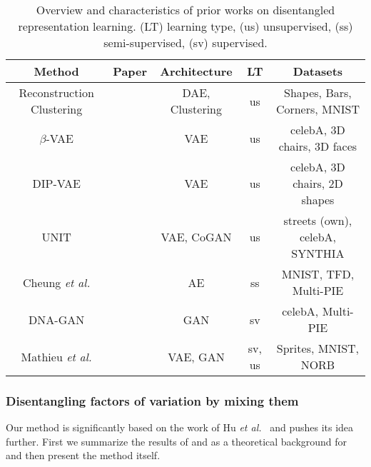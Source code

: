 \documentclass[12pt,a4paper]{article}
\begin{document}
\begin{table} [H]
\centering
\begin{tabular}{|c|c|c|c|c|}
\hline
\textbf{Method} & \textbf{Paper} & \textbf{Architecture} & \textbf{LT} & \textbf{Datasets}\\
\hline
Reconstruction Clustering & \cite{BindingRC} & DAE, Clustering & us & Shapes, Bars, Corners, MNIST \\
\hline
$\beta$-VAE & \cite{betaVAE} & VAE & us & celebA, 3D chairs, 3D faces \\
\hline
DIP-VAE & \cite{DIPVAE} & VAE &  us & celebA, 3D chairs, 2D shapes \\
\hline
UNIT & \cite{UNIT} & VAE, CoGAN & us & streets (own), celebA, SYNTHIA \\
\hline
Cheung \textit{et al.} & \cite{DiscHiddenFoViDN} & AE & ss & MNIST, TFD, Multi-PIE \\
\hline
DNA-GAN & \cite{DnaGan} & GAN & sv & celebA, Multi-PIE \\
\hline
Mathieu \textit{et al.} & \cite{1611.03383} & VAE, GAN & sv, us & Sprites, MNIST, NORB \\
\hline
\end{tabular}
\caption{Overview and characteristics of prior works on disentangled representation learning. (LT) learning type, (us) unsupervised, (ss) semi-supervised, (sv) supervised.} \label{tab:priorWorks}
\end{table}

\subsubsection{Disentangling factors of variation by mixing them}
Our method is significantly based on the work of Hu \textit{et al.}~\cite{DisentFacOfVarByMixTh} and pushes its idea further. First we summarize the results of \cite{ChallengInDisentIFoF} and \cite{UnderstDegenAndAmbInAT} as a theoretical background for \cite{DisentFacOfVarByMixTh} and then present the method itself. 
\end{document}
